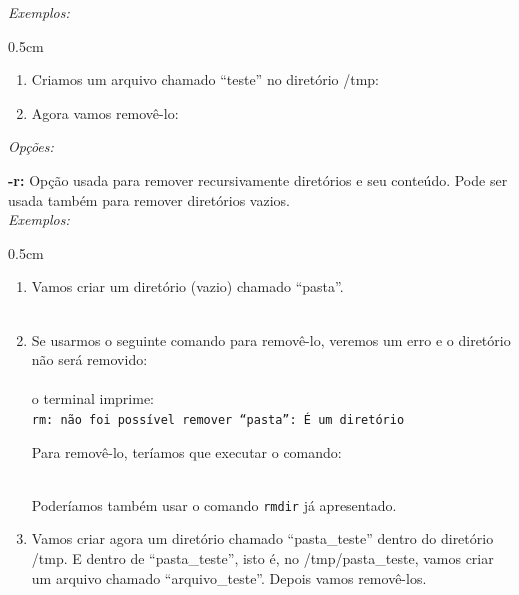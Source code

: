 \begin{refsection}
\textit{Exemplos:}
\begin {myindentpar}{0.5cm}
\begin{enumerate}[\itshape i.]

\item{Criamos um arquivo chamado ``teste'' no diretório /tmp:}\\

\item{Agora vamos removê-lo:}\\

\end{enumerate}
\end{myindentpar}

\textit{Opções:}

\textbf{-r:} Opção usada para remover recursivamente diretórios e seu conteúdo. Pode ser usada também para remover diretórios vazios.\\

\textit{Exemplos:}
\begin {myindentpar}{0.5cm}
\begin{enumerate}[\itshape i.]

 \item{Vamos criar um diretório (vazio) chamado ``pasta''.}\\
	\\
 \item{Se usarmos o seguinte comando para removê-lo, veremos um erro e o diretório não será removido:}\\
	\\
o terminal imprime:\\
\texttt{rm: não foi possível remover “pasta”: É um diretório}

Para removê-lo, teríamos que executar o comando:

 \\
Poderíamos também usar o comando \texttt{rmdir} já apresentado.\\

 \item{Vamos criar agora um diretório chamado ``pasta\_teste'' dentro do diretório /tmp. E dentro de ``pasta\_teste'', isto é, no /tmp/pasta\_teste, vamos criar um arquivo chamado ``arquivo\_teste''. Depois vamos removê-los.}
\\
 \\


\end{enumerate}
\end{myindentpar}
\end{refsection}
